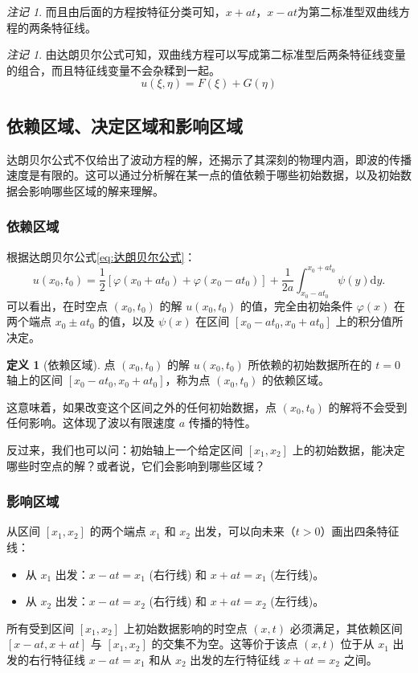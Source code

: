 \documentclass[12pt,a4paper]{article}
\numberwithin{subsection}{section}   %
\numberwithin{subsubsection}{subsection}
\theoremstyle{plain}
\theoremstyle{definition}
\newtheorem{definition}[theorem]{定义}
\theoremstyle{remark}
\newtheorem{remark}[theorem]{注记}
\theoremstyle{remark}
\begin{document}
	\begin{remark}
		而且由后面的方程按特征分类可知，$x + a t$，$x - a t$为第二标准型双曲线方程的两条特征线。
	\end{remark}
	\begin{remark}
	由达朗贝尔公式可知，双曲线方程可以写成第二标准型后两条特征线变量的组合，而且特征线变量不会杂糅到一起。
	\[
	u(\xi, \eta) = F(\xi) + G(\eta)
	\]
\end{remark}

	\subsection{依赖区域、决定区域和影响区域}
	达朗贝尔公式不仅给出了波动方程的解，还揭示了其深刻的物理内涵，即波的传播速度是有限的。这可以通过分析解在某一点的值依赖于哪些初始数据，以及初始数据会影响哪些区域的解来理解。
	
		\subsubsection{依赖区域 }
	根据达朗贝尔公式\eqref{eq:达朗贝尔公式}：
	\[
	u(x_0, t_0) = \frac{1}{2} \left[ \varphi(x_0 + a t_0) + \varphi(x_0 - a t_0) \right] + \frac{1}{2 a} \int_{x_0 - a t_0}^{x_0 + a t_0} \psi(y) \mathrm{d}y.
	\]
	可以看出，在时空点 \((x_0, t_0)\) 的解 \(u(x_0, t_0)\) 的值，完全由初始条件 \(\varphi(x)\) 在两个端点 \(x_0 \pm at_0\) 的值，以及 \(\psi(x)\) 在区间 \([x_0 - at_0, x_0 + at_0]\) 上的积分值所决定。
	
	\begin{definition}[依赖区域]
		点 \((x_0, t_0)\) 的解 \(u(x_0, t_0)\) 所依赖的初始数据所在的 \(t=0\) 轴上的区间 \([x_0 - at_0, x_0 + at_0]\)，称为点 \((x_0, t_0)\) 的依赖区域。
	\end{definition}
	
	这意味着，如果改变这个区间之外的任何初始数据，点 \((x_0, t_0)\) 的解将不会受到任何影响。这体现了波以有限速度 \(a\) 传播的特性。
	
	反过来，我们也可以问：初始轴上一个给定区间 \([x_1, x_2]\) 上的初始数据，能决定哪些时空点的解？或者说，它们会影响到哪些区域？
	


\subsubsection{影响区域 }
从区间 \([x_1, x_2]\) 的两个端点 \(x_1\) 和 \(x_2\) 出发，可以向未来（\(t>0\)）画出四条特征线：
\begin{itemize}
	\item 从 \(x_1\) 出发：\(x - at = x_1\) (右行线) 和 \(x + at = x_1\) (左行线)。
	\item 从 \(x_2\) 出发：\(x - at = x_2\) (右行线) 和 \(x + at = x_2\) (左行线)。
\end{itemize}
所有受到区间 \([x_1, x_2]\) 上初始数据影响的时空点 \((x,t)\) 必须满足，其依赖区间 \([x-at, x+at]\) 与 \([x_1, x_2]\) 的交集不为空。这等价于该点 \((x,t)\) 位于从 \(x_1\) 出发的右行特征线 \(x-at=x_1\) 和从 \(x_2\) 出发的左行特征线 \(x+at=x_2\) 之间。
\end{document}
